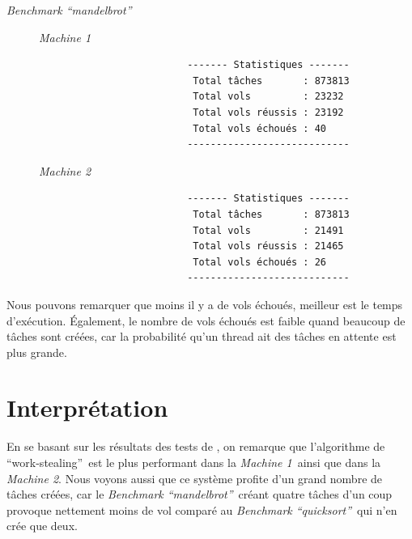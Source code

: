 \documentclass[a4paper]{article}
\def\mone{\textit{Machine 1}} %
\def\mtwo{\textit{Machine 2}} %
\def\qs{\enquote{quicksort}}
\def\mandel{\enquote{mandelbrot}}
\def\bone{\textit{Benchmark \qs}}
\def\btwo{\textit{Benchmark \mandel}}
\def\ws{\enquote{work-stealing}}
\newcommand{\docref}[1]{\textit{\nameref{#1}}} %
\begin{document}
\begin{description}
  \item[\btwo] \hspace{1em}
        \begin{description}
          \item[\mone] \hspace{1em}
                \begin{samepage}
                  \begin{verbatim}
                    ------- Statistiques -------
                     Total tâches       : 873813
                     Total vols         : 23232
                     Total vols réussis : 23192
                     Total vols échoués : 40
                    ----------------------------
                  \end{verbatim}
                \end{samepage}
          \item[\mtwo] \hspace{1em}
                \begin{samepage}
                  \begin{verbatim}
                    ------- Statistiques -------
                     Total tâches       : 873813
                     Total vols         : 21491
                     Total vols réussis : 21465
                     Total vols échoués : 26
                    ----------------------------
                  \end{verbatim}
                \end{samepage}
        \end{description}
\end{description}

Nous pouvons remarquer que moins il y a de vols échoués, meilleur est
le temps d'exécution. Également, le nombre de vols échoués est faible quand
beaucoup de tâches sont créées, car la probabilité qu'un thread ait des tâches
en attente est plus grande.


\section{Interprétation}
En se basant sur les résultats des tests de \docref{sec:stats}, on remarque
que l'algorithme de \ws~est le plus performant dans la \mone~ainsi que dans
la \mtwo. Nous voyons aussi que ce système profite d'un grand nombre de
tâches créées, car le \btwo~créant quatre tâches d'un coup provoque nettement
moins de vol comparé au \bone~qui n'en crée que deux.
\end{document}
